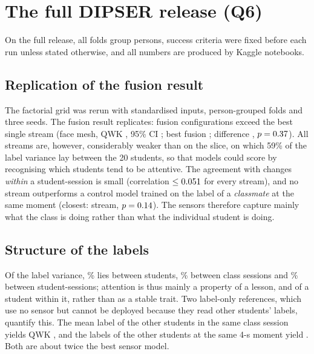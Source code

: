 \section{The full DIPSER release (Q6)}
\label{sec:fullcorpus}

On the full release, all folds group persons, success criteria were fixed before each run unless stated otherwise, and all numbers are produced by Kaggle notebooks.

\subsection{Replication of the fusion result}
\label{sec:fc-fusion}
The factorial grid was rerun with standardised inputs, person-grouped folds and three seeds. The fusion result replicates: \fcFusionsAbove{} fusion configurations exceed the best single stream (face mesh, QWK \fcBestSingleQWK, 95\% CI \fcBestSingleCI; best fusion \fcBestFusionQWK; difference \fcFusionDiff{} \fcFusionDiffCI, $p=0.37$). All streams are, however, considerably weaker than on the slice, on which 59\% of the label variance lay between the 20 students, so that models could score by recognising which students tend to be attentive.  The agreement with changes \emph{within} a student-session is small (correlation $\le0.051$ for every stream), and no stream outperforms a control model trained on the label of a \emph{classmate} at the same moment (closest: \fcClassmateStream{} stream, $p=0.14$). The sensors therefore capture mainly what the class is doing rather than what the individual student is doing.

\subsection{Structure of the labels}
\label{sec:fc-labels}
Of the label variance, \fcSharePerson\% lies between students, \fcShareClass\% between class sessions and \fcShareSession\% between student-sessions; attention is thus mainly a property of a lesson, and of a student within it, rather than as a stable trait. Two label-only references, which use no sensor but cannot be deployed because they read other students' labels, quantify this. The mean label of the other students in the same class session yields QWK \fcExpPrior, and the labels of the other students at the same 4-s moment yield \fcMomentPrior. Both are about twice the best sensor model.

